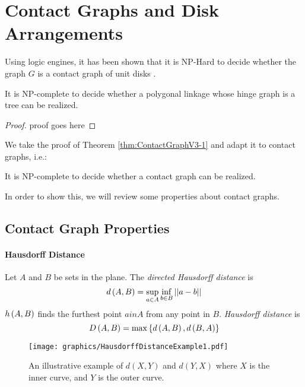 \section{Contact Graphs and Disk Arrangements}
Using logic engines, it has been shown that it is NP-Hard to decide whether the graph $G$ is a contact graph of unit disks \cite{BET+99}. 
\begin{thm}\label{thm:ContactGraphV3-1}
It is NP-complete to decide whether a polygonal linkage whose hinge graph is a tree can be realized.
\end{thm} 
\begin{proof}
proof goes here
\end{proof}
We take the proof of Theorem \ref{thm:ContactGraphV3-1} and adapt it to contact graphs, i.e.:
\begin{thm}\label{thm:ContactGraphV3-2}
It is NP-complete to decide whether a contact graph can be realized.
\end{thm}
In order to show this, we will review some properties about contact graphs.
\subsection{Contact Graph Properties}
\paragraph{Hausdorff Distance}  Let $A$ and $B$ be sets in the plane. The \textit{directed Hausdorff distance} is 
\begin{equation}\label{eqn:ContactGraphV3-1}
d\left( A,B \right) = \sup_{a \in A} \inf_{b \in B} \left\vert\left\vert a-b \right\vert \right\vert
\end{equation}
$h\left( A,B \right)$ finds the furthest point $a in A$ from any point in $B$.  \textit{Hausdorff distance} is
\begin{equation}\label{eqn:ContactGraphV3-2}
D\left( A,B \right) = \max \left\lbrace d\left( A,B \right), d\left( B,A \right) \right\rbrace
\end{equation}
\begin{figure}[!htbp]
\begin{center}
\texttt{[image: graphics/HausdorffDistanceExample1.pdf]}
\caption{An illustrative example of $d(X,Y)$ and $d(Y,X)$ where $X$ is the inner curve, and $Y$ is the outer curve.}\label{fig:HausdorffDistanceExample1.pdf}
\end{center}
\end{figure}
